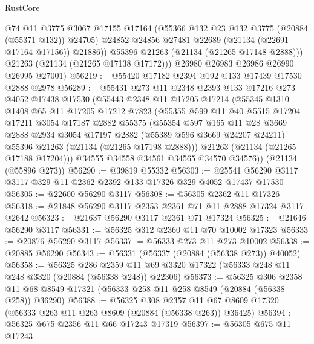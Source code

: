 \begin{lexlean}{RustCore}
\begin{coremodule}
              @74
              @11
              @3775
              @3067
              @17155
              @17164
              (@55366 @132 @23 @132 @3775 (@20884 (@55371 @132)) @24705)
              @24852
              @24856
              @27481
              @22689
              (@21134 (@22691 @17164 @17156))
              @21886))
          @55396
          @21263
          (@21134 (@21265 @17148 @2888)))
        @21263
        (@21134 (@21265 @17138 @17172)))
      @26980
      @26983
      @26986
      @26990
      @26995
      @27001)
@56219 := @55420 @17182 @2394 @192 @133 @17439 @17530 @2888 @2978
@56289 := @55431
    @273
    @11
    @2348
    @2393
    @133
    @17216
    @273
    @4052
    @17438
    @17530
    (@55443
      @2348
      @11
      @17205
      @17214
      (@55345
        @1310
        @1408
        @65
        @11
        @17205
        @17212
        @7823
        (@55355
          @599
          @11
          @40
          @5515
          @17204
          @17211
          @3054
          @17187
          @2882
          @55375
          (@55354
            @597
            @165
            @11
            @28
            @3669
            @2888
            @2934
            @3054
            @17197
            @2882
            (@55389 @596 @3669 @24207 @24211)
            @55396
            @21263
            (@21134 (@21265 @17198 @2888)))
          @21263
          (@21134 (@21265 @17188 @17204)))
        @34555
        @34558
        @34561
        @34565
        @34570
        @34576))
    (@21134 (@55896 @273))
@56290 := @39819 @55332
@56303 := @25541 @56290 @3117 @3117 @329 @11 @2362 @2392 @133 @17326 @329 @4052 @17437 @17530
@56305 := @22600 @56290 @3117
@56308 := @56305 @2362 @11 @17326
@56318 := @21848 @56290 @3117 @2353 @2361 @71 @11 @2888 @17324 @3117 @2642
@56323 := @21637 @56290 @3117 @2361 @71 @17324
@56325 := @21646 @56290 @3117
@56331 := @56325 @312 @2360 @11 @70 @10002 @17323
@56333 := @20876 @56290 @3117
@56337 := @56333 @273 @11 @273 @10002
@56338 := @20885 @56290
@56343 := @56331 (@56337 (@20884 (@56338 @273)) @40052)
@56358 := @56325
    @286
    @2359
    @11
    @69
    @3320
    @17322
    (@56333 @248 @11 @248 @3320 (@20884 (@56338 @248)) @22306)
@56373 := @56325
    @306
    @2358
    @11
    @68
    @8549
    @17321
    (@56333 @258 @11 @258 @8549 (@20884 (@56338 @258)) @36290)
@56388 := @56325
    @308
    @2357
    @11
    @67
    @8609
    @17320
    (@56333 @263 @11 @263 @8609 (@20884 (@56338 @263)) @36425)
@56394 := @56325 @675 @2356 @11 @66 @17243 @17319
@56397 := @56305 @675 @11 @17243

\end{coremodule}
\end{lexlean}

